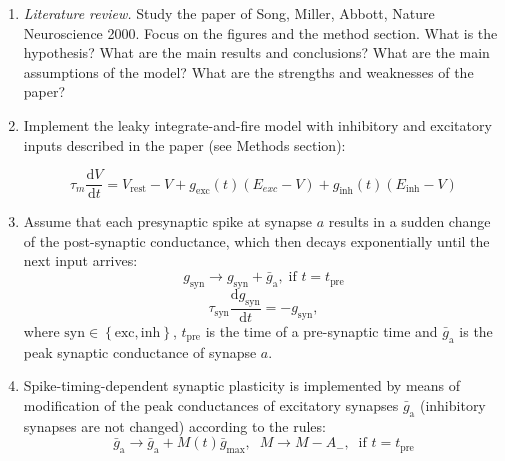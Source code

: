 \documentclass[12pt]{article}
\newcommand{\tderiv}[1]{\frac{\mathrm{d}#1}{\mathrm{d}t}}
\begin{document}
\begin{enumerate}
    \item \textit{Literature review.} Study the paper of Song, Miller,
        Abbott, Nature Neuroscience 2000. Focus on the figures and the method
        section. What is the hypothesis? What are the main results
        and conclusions? What are the main assumptions of the model?
        What are the strengths and weaknesses of the paper?

    \item
        Implement the leaky integrate-and-fire model with inhibitory
        and excitatory inputs described in
        the paper (see Methods section):

        \begin{equation}
            \tau_m
            \tderiv{V}=V_\mathrm{rest}-V+g_\mathrm{exc}(t)(E_{exc}-V)+g_\mathrm{inh}(t)(E_\mathrm{inh}-V)
            \label{eq:lif}
        \end{equation}
    \item Assume that each presynaptic spike at synapse $a$ results in a sudden
        change of the post-synaptic conductance, which then decays
        exponentially until the next input arrives:
        \begin{equation}
            g_\mathrm{syn} \rightarrow g_\mathrm{syn} +
            \bar{g}_\mathrm{a},\;\text{if } t =
            t_\mathrm{pre}
            \label{eq:conductance2}
        \end{equation}
        \begin{equation}
            \tau_\mathrm{syn} \tderiv{g_\mathrm{syn}} =
            -g_\mathrm{syn},
            \label{eq:conductance2}
        \end{equation}
        where $\mathrm{syn} \in  \left\{\mathrm{exc},
        \mathrm{inh}\right\}$, $t_\mathrm{pre}$ is the time of a pre-synaptic
        time and $\bar{g}_\mathrm{a}$ is the peak synaptic conductance of
        synapse $a$.
    \item  Spike-timing-dependent synaptic plasticity is implemented by
        means of modification of the peak conductances
        of excitatory synapses $\bar{g}_\mathrm{a}$ (inhibitory
        synapses are not changed) according
        to the rules:
        \begin{equation} 
            \bar{g}_\mathrm{a} \rightarrow
            \bar{g}_\mathrm{a}+M(t)\bar{g}_\mathrm{max},\; \;
            M \rightarrow M - A_-, \; \;
            \text{if } t =
            t_\mathrm{pre}
        \end{equation}

\end{enumerate}
\end{document}

